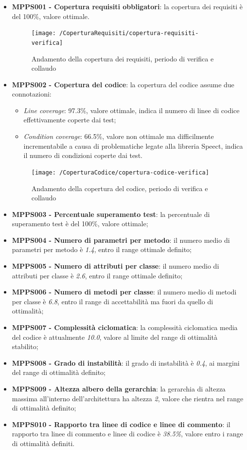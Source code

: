 \documentclass[openany,12pt,a4paper]{report}
\begin{document}
\begin{itemize}
	\item \textbf{MPPS001 - Copertura requisiti obbligatori}: la copertura dei requisiti è del 100\%, valore ottimale.
	
	\begin{figure}[H]
		\texttt{[image: /CoperturaRequisiti/copertura-requisiti-verifica]}
		\centering
		\caption{Andamento della copertura dei requisiti, periodo di verifica e collaudo}
	\end{figure}

	\item \textbf{MPPS002 - Copertura del codice}: la copertura del codice assume due connotazioni:
	\begin{itemize}
		\item \textit{Line coverage}: 97.3\%, valore ottimale, indica il numero di linee di codice effettivamente coperte dai test;
		\item \textit{Condition coverage}: 66.5\%, valore non ottimale ma difficilmente incrementabile a causa di problematiche legate alla libreria Speect, indica il numero di condizioni coperte dai test. 
	\end{itemize}

	\begin{figure}[H]
		\texttt{[image: /CoperturaCodice/copertura-codice-verifica]}
		\centering
		\caption{Andamento della copertura del codice, periodo di verifica e collaudo}
	\end{figure}

	\item \textbf{MPPS003 - Percentuale superamento test}: la percentuale di superamento test è del 100\%, valore ottimale;
	\item \textbf{MPPS004 - Numero di parametri per metodo}: il numero medio di parametri per metodo è \textit{1.4}, entro il range ottimale definito;
	\item \textbf{MPPS005 - Numero di attributi per classe}: il numero medio di attributi per classe è \textit{2.6}, entro il range ottimale definito;
	\item \textbf{MPPS006 - Numero di metodi per classe}: il numero medio di metodi per classe è \textit{6.8}, entro il range di accettabilità ma fuori da quello di ottimalità;
	\item \textbf{MPPS007 - Complessità ciclomatica}: la complessità ciclomatica media del codice è attualmente \textit{10.0}, valore al limite del range di ottimalità stabilito;
	\item \textbf{MPPS008 - Grado di instabilità}: il grado di instabilità è \textit{0.4}, ai margini del range di ottimalità definito;
	\item \textbf{MPPS009 - Altezza albero della gerarchia}: la gerarchia di altezza massima all'interno dell'architettura ha altezza \textit{2}, valore che rientra nel range di ottimalità definito;
	\item \textbf{MPPS010 - Rapporto tra linee di codice e linee di commento}: il rapporto tra linee di commento e linee di codice è \textit{38.5\%}, valore entro i range di ottimalità definiti.
\end{itemize}
\end{document}

